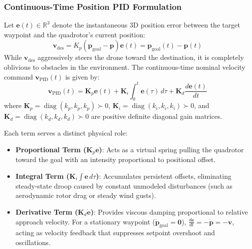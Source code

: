 \documentclass[11pt,a4paper]{article}
\begin{document}
\subsubsection{Continuous-Time Position PID Formulation}
Let $\mathbf{e}(t) \in \mathbb{R}^3$ denote the instantaneous 3D position error between the target waypoint and the quadrotor's current position:
\begin{equation}
\mathbf{v}_{\mathrm{des}} = K_p (\mathbf{p}_{\mathrm{goal}} - \mathbf{p})
\mathbf{e}(t) = \mathbf{p}_{\mathrm{goal}}(t) - \mathbf{p}(t)
\label{eq:pos_error}
\end{equation}
While $\mathbf{v}_{\mathrm{des}}$ aggressively steers the drone toward the destination, it is completely oblivious to obstacles in the environment.
The continuous-time nominal velocity command $\mathbf{v}_{\mathrm{PID}}(t)$ is given by:
\begin{equation}
\mathbf{v}_{\mathrm{PID}}(t) = \mathbf{K}_p \mathbf{e}(t) + \mathbf{K}_i \int_{0}^{t} \mathbf{e}(\tau) \, d\tau + \mathbf{K}_d \frac{d\mathbf{e}(t)}{dt}
\label{eq:pid_continuous}
\end{equation}
where $\mathbf{K}_p = \operatorname{diag}(k_p, k_p, k_p) \succ 0$, $\mathbf{K}_i = \operatorname{diag}(k_i, k_i, k_i) \succ 0$, and $\mathbf{K}_d = \operatorname{diag}(k_d, k_d, k_d) \succ 0$ are positive definite diagonal gain matrices. 

Each term serves a distinct physical role:
\begin{itemize}
    \item \textbf{Proportional Term ($\mathbf{K}_p \mathbf{e}$)}: Acts as a virtual spring pulling the quadrotor toward the goal with an intensity proportional to positional offset.
    \item \textbf{Integral Term ($\mathbf{K}_i \int \mathbf{e} \, d\tau$)}: Accumulates persistent offsets, eliminating steady-state droop caused by constant unmodeled disturbances (such as aerodynamic rotor drag or steady wind gusts).
    \item \textbf{Derivative Term ($\mathbf{K}_d \dot{\mathbf{e}}$)}: Provides viscous damping proportional to relative approach velocity. For a stationary waypoint ($\mathbf{\dot{p}}_{\mathrm{goal}} = \mathbf{0}$), $\frac{d\mathbf{e}}{dt} = -\mathbf{\dot{p}} = -\mathbf{v}$, acting as velocity feedback that suppresses setpoint overshoot and oscillations.
\end{itemize}
\end{document}
